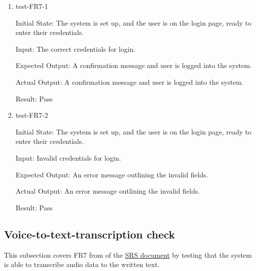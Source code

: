 \documentclass[12pt, titlepage]{article}
\begin{document}
\begin{enumerate}

  \item{test-FR7-1} \label{test-FR7-1}
  
  Initial State:  The system is set up, and the user is on the login page, ready to enter their credentials.

  Input: The correct credentials for login.

  Expected Output: A confirmation message and user is logged into the system.

  Actual Output: A confirmation message and user is logged into the system.

  Result: Pass


  \item{test-FR7-2} \label{test-FR7-2}

  Initial State:  The system is set up, and the user is on the login page, ready to enter their credentials.

  Input: Invalid credentials for login.

  Expected Output: An error message outlining the invalid fields.

  Actual Output: An error message outlining the invalid fields.

  Result: Pass

\end{enumerate}

\subsection{Voice-to-text-transcription check} \label{section:3.5}

This subsection covers FR7 from of the \href{https://github.com/Inreet-Kaur/capstone/blob/main/docs/SRS/SRS.pdf} {SRS document} by testing that the system is able to transcribe audio data to the written text.
\end{document}
